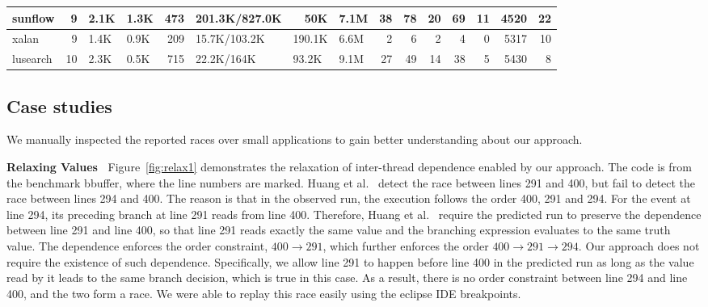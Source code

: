 \begin{table}[htbp]
\begin{flushleft}
\begin{tabular}{|l|r|r|r|r|l|r|r|r|r|r|r|r|r|r|}
sunflow & 9 & \multicolumn{1}{l|}{2.1K} & \multicolumn{1}{l|}{1.3K} & 473 & 201.3K/827.0K & 50K & \multicolumn{1}{l|}{7.1M} & 38 & 78 & 20 & 69 & 11 & 4520 & 22 \\ \hline
xalan & 9 & \multicolumn{1}{l|}{1.4K} & \multicolumn{1}{l|}{0.9K} & 209 & 15.7K/103.2K & \multicolumn{1}{l|}{190.1K} & \multicolumn{1}{l|}{6.6M} & 2 & 6 & 2 & 4 & 0 & 5317 & 10 \\ \hline
lusearch & 10 & \multicolumn{1}{l|}{2.3K} & \multicolumn{1}{l|}{0.5K} & 715 & 22.2K/164K & \multicolumn{1}{l|}{93.2K} & \multicolumn{1}{l|}{9.1M} & 27 & 49 & 14 & 38 & 5 & 5430 & 8 \\ \hline
\end{tabular}
\end{flushleft}
\label{tab:main}
\end{table}









  



\subsection{Case studies}
We manually inspected the reported races over small applications to gain better understanding about our approach. 

{\bf Relaxing Values\ } Figure~\ref{fig:relax1} demonstrates the relaxation of inter-thread dependence enabled by our approach. 
The code is from the benchmark {\sf bbuffer}, where the line numbers are
marked. Huang et al.~\cite{} detect the race between lines 291 and 400, 
but fail to detect the race between lines 294 and 400. The reason is 
that in the observed run, the execution follows the order 400, 291 and 294. 
For the event at line 294, its preceding branch at line 291 reads 
from line 400. Therefore, Huang et al.~\cite{}
require the predicted run to preserve the dependence between line 291 and 
line 400, so that line 291 reads exactly the same value and the branching 
expression evaluates to the same truth value. The dependence enforces 
the order constraint, $400 \rightarrow 291$, which further enforces 
the order $400\rightarrow 291 \rightarrow 294$.    Our approach does not 
require the existence of such dependence. Specifically, we allow line 
291 to happen before line 400 in the predicted run as long as the value 
read by it leads to the same branch decision, which is true in this case.  
As a result, there is no order constraint between line 294 and 
line 400, and the two form a race. We were able to replay this race  
easily using the eclipse IDE breakpoints. 


